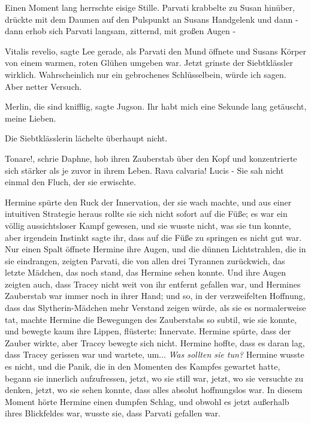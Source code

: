 Einen Moment lang herrschte eisige Stille. Parvati krabbelte zu Susan hinüber, drückte mit dem Daumen auf den Pulspunkt an Susans Handgelenk und dann - dann erhob sich Parvati langsam, zitternd, mit großen Augen -

\glqq Vitalis revelio\grqq{}, sagte Lee gerade, als Parvati den Mund öffnete und Susans Körper von einem warmen, roten Glühen umgeben war. Jetzt grinste der Siebtklässler wirklich. \glqq Wahrscheinlich nur ein gebrochenes Schlüsselbein, würde ich sagen. Aber netter Versuch.\grqq{}

\glqq Merlin, die sind knifflig\grqq{}, sagte Jugson. \glqq Ihr habt mich eine Sekunde lang getäuscht, meine Lieben.\grqq{}

Die Siebtklässlerin lächelte überhaupt nicht.

\glqq Tonare!\grqq{}, schrie Daphne, hob ihren Zauberstab über den Kopf und konzentrierte sich stärker als je zuvor in ihrem Leben. \glqq Rava calvaria! Lucis -\grqq{}
Sie sah nicht einmal den Fluch, der sie erwischte.

Hermine spürte den Ruck der Innervation, der sie wach machte, und aus einer intuitiven Strategie heraus rollte sie sich nicht sofort auf die Füße; es war ein völlig aussichtsloser Kampf gewesen, und sie wusste nicht, was sie tun konnte, aber irgendein Instinkt sagte ihr, dass auf die Füße zu springen es nicht gut war. Nur einen Spalt öffnete Hermine ihre Augen, und die dünnen Lichtstrahlen, die in sie eindrangen, zeigten Parvati, die von allen drei Tyrannen zurückwich, das letzte Mädchen, das noch stand, das Hermine sehen konnte. Und ihre Augen zeigten auch, dass Tracey nicht weit von ihr entfernt gefallen war, und Hermines Zauberstab war immer noch in ihrer Hand; und so, in der verzweifelten Hoffnung, dass das Slytherin-Mädchen mehr Verstand zeigen würde, als sie es normalerweise tat, machte Hermine die Bewegungen des Zauberstabs so subtil, wie sie konnte, und bewegte kaum ihre Lippen, flüsterte: \glqq Innervate.\grqq{} Hermine spürte, dass der Zauber wirkte, aber Tracey bewegte sich nicht. Hermine hoffte, dass es daran lag, dass Tracey gerissen war und wartete, um... \emph{Was sollten sie tun?} Hermine wusste es nicht, und die Panik, die in den Momenten des Kampfes gewartet hatte, begann sie innerlich aufzufressen, jetzt, wo sie still war, jetzt, wo sie versuchte zu denken, jetzt, wo sie sehen konnte, dass alles absolut hoffnungslos war. In diesem Moment hörte Hermine einen dumpfen Schlag, und obwohl es jetzt außerhalb ihres Blickfeldes war, wusste sie, dass Parvati gefallen war.

